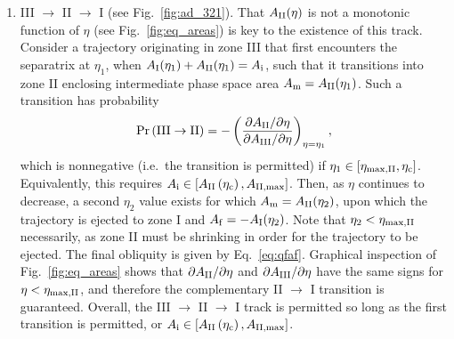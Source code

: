 \begin{enumerate}
    \item III $\to$ II $\to$ I (see Fig.~\ref{fig:ad_321}). That $A_{\rm
        II}(\eta)$ is not a monotonic function of $\eta$ (see
        Fig.~\ref{fig:eq_areas}) is key to the existence of this track. Consider
        a trajectory originating in zone III that first encounters the
        separatrix at $\eta_1$, when $A_{\rm I}(\eta_1) + A_{\rm II}(\eta_1) =
        A_{\rm i}$, such that it transitions into zone II enclosing intermediate
        phase space area $A_{\rm m} = A_{\rm II}(\eta_1)$. Such a transition has
        probability
        \begin{equation}
            \Pr\p{\rm III \to II} = -\p{
                \frac{\pdil{A_{\rm II}}{\eta}}{\pdil{A_{\rm III}}{\eta}}}
                    _{\eta = \eta_1},
        \end{equation}
        which is nonnegative (i.e.\ the transition is permitted) if $\eta_1 \in
        [\eta_{\rm \max, II}, \eta_{\rm c}]$. Equivalently, this requires
        $A_{\rm i} \in \left[A_{\rm II}\left(\eta_{\rm c}\right) , A_{\rm II, \max}\right]$. Then,
        as $\eta$ continues to decrease, a second $\eta_2$ value exists for
        which $A_{\rm m} = A_{\rm II}(\eta_2)$, upon which the trajectory is
        ejected to zone I and $A_{\rm f} = -A_{\rm I}(\eta_2)$. Note that
        $\eta_2 < \eta_{\rm \max, II}$ necessarily, as zone II must be shrinking
        in order for the trajectory to be ejected. The final obliquity is given
        by Eq.~\eqref{eq:qfaf}. Graphical inspection of Fig.~\ref{fig:eq_areas}
        shows that $\partial A_{\rm II} / \partial\eta$ and $\partial A_{\rm III} / \partial\eta$ have
        the same signs for $\eta < \eta_{\rm \max, II}$, and therefore the
        complementary II $\to$ I transition is guaranteed. Overall, the III
        $\to$ II $\to$ I track is permitted so long as the first transition is
        permitted, or $A_{\rm i} \in \left[A_{\rm II}\left(\eta_{\rm c}\right) , A_{\rm II,
        \max}\right]$.


\end{enumerate}
